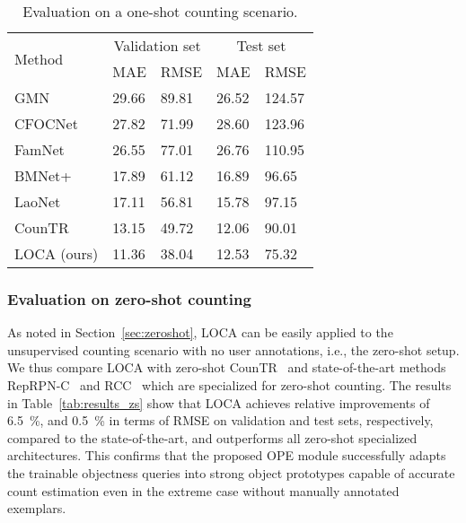 \documentclass[10pt,twocolumn,letterpaper]{article}
\newcommand*\circledd[1]{\tikz[baseline=(char.base)]{
            \node[shape=circle,draw,inner sep=0.15pt] (char) {#1};}}
\newcommand{\first}[1]{{#1\raisebox{0.8pt}{\footnotesize \color{gold} \circledd{1}}}}
\newcommand{\second}[1]{{#1\raisebox{0.8pt}{\footnotesize \color{silver} \circledd{2}}}}
\newcommand{\third}[1]{{#1\raisebox{0.8pt}{\footnotesize \color{bronze} \circledd{3}}}}
\begin{document}
\begin{table}[htbp]
    \centering
    \begin{tabular}{l l l l l}\toprule
        \multirow{2}{*}{Method}& \multicolumn{2}{c}{Validation set} & \multicolumn{2}{c}{Test set} \\
        & MAE & RMSE & MAE & RMSE \\ 
        \midrule
        GMN~\cite{gmnclass} & 29.66 & 89.81 & 26.52 & 124.57 \\
        CFOCNet~\cite{cfocnet} & 27.82 & 71.99 & 28.60 & 123.96 \\ FamNet~\cite{famnet} & 26.55 & 77.01 & 26.76 & 110.95 \\
        BMNet+~\cite{bmnet} & 17.89 & 61.12 & 16.89 & \third{96.65} \\
        LaoNet~\cite{laonet}& \third{17.11} & \third{56.81} & \third{15.78} & 97.15 \\
        CounTR~\cite{countr}& \second{13.15} & \second{49.72} & \first{12.06} & \second{90.01} \\
        LOCA (ours) & \first{11.36} & \first{38.04} & \second{12.53} & \first{75.32} \\
        \bottomrule
    \end{tabular}
    \caption{Evaluation on a one-shot counting scenario.}
    \label{tab:results_os}
\end{table}

\subsubsection{Evaluation on zero-shot counting}



As noted in Section~\ref{sec:zeroshot}, LOCA can be easily applied to the unsupervised counting scenario with no user annotations, i.e., the zero-shot setup. 
We thus compare LOCA with zero-shot CounTR~\cite{countr} and state-of-the-art methods RepRPN-C~\cite{reprpn} and RCC~\cite{hobley} which are specialized for zero-shot counting. 
The results in Table~\ref{tab:results_zs} show that LOCA achieves relative improvements of 6.5~\%, and 0.5~\% in terms of RMSE on validation and test sets, respectively, compared to the state-of-the-art, and outperforms all zero-shot specialized architectures. This confirms that the proposed OPE module successfully adapts the trainable objectness queries into strong object prototypes capable of accurate count estimation even in the extreme case without manually annotated exemplars.
\end{document}
